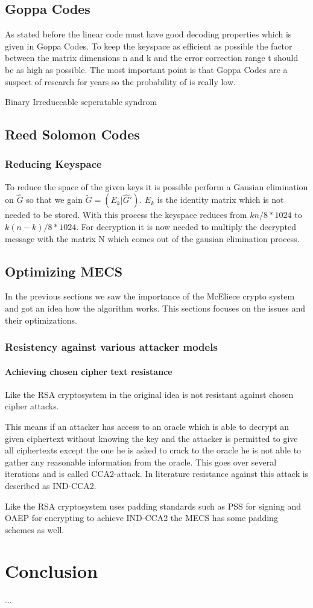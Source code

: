 \subsection*{Goppa Codes}
As stated before the linear code must have good decoding properties which is given in Goppa Codes. To keep the keyspace as efficient as possible the factor between the matrix dimensions n and k and the error correction range t should be as high as possible. The most important point is that Goppa Codes are a suspect of research for years so the probability of is really low. 

Binary
Irreduceable
seperatable
syndrom
\subsection*{Reed Solomon Codes}

\subsubsection{Reducing Keyspace}
To reduce the space of the given keys it is possible perform a Gausian elimination on $\hat{G}$ so that we gain $\tilde{G} = (E_{k}|\hat{G}')$. $E_{k}$ is the identity matrix which is not needed to be stored. With this process the keyspace reduces from $kn / 8 * 1024$ to $k(n-k) / 8 * 1024$.
For decryption it is now needed to multiply the decrypted message with the matrix N which comes out of the gausian elimination process. 
\subsection{Optimizing MECS}
In the previous sections we saw the importance of the McEliece crypto system and got an idea how the algorithm works. This sections focuses on the issues and their optimizations. 
\subsubsection{Resistency against various attacker models}
\paragraph{Achieving chosen cipher text resistance}

Like the RSA cryptosystem in the original idea is not resistant against chosen cipher attacks. 

This means if an attacker has access to an oracle which is able to decrypt an given ciphertext without knowing the key and the attacker is permitted to give all ciphertexts except the one he is asked to crack to the oracle he is not able to gather any reasonable information from the oracle. This goes over several iterations and is called CCA2-attack. In literature resistance against this attack is described as IND-CCA2. 

Like the RSA cryptosystem uses padding standards such as PSS for signing and OAEP for encrypting to achieve IND-CCA2 the MECS has some padding schemes as well.

\section{Conclusion}
...

